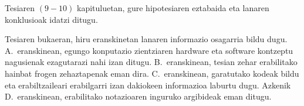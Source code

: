 Tesiaren $(9-10)$ kapituluetan, gure hipotesiaren eztabaida eta lanaren konklusioak idatzi ditugu.

Tesiaren bukaeran, hiru eranskinetan lanaren informazio osagarria bildu dugu. A.~eranskinean, egungo konputazio zientziaren hardware eta software kontzeptu nagusienak ezagutarazi nahi izan ditugu. B.~eranskinean, tesian zehar erabilitako hainbat frogen zehaztapenak eman dira. C.~eranskinean, garatutako kodeak bildu eta erabiltzaileari erabilgarri izan dakiokeen informazioa laburtu dugu. Azkenik D.~eranskinean, erabilitako notazioaren inguruko argibideak eman ditugu.

      
      

